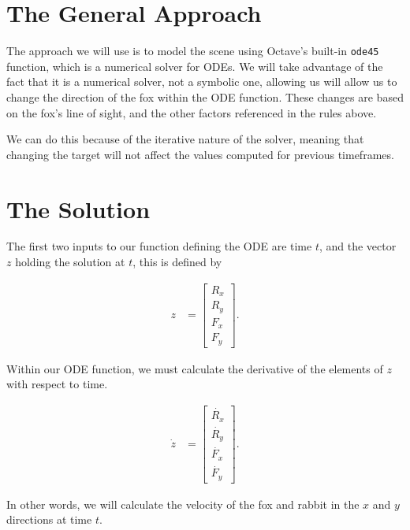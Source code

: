 

\section{The General Approach}

The approach we will use is to model the scene using Octave's built-in \texttt{ode45} function, which is a numerical solver for ODEs. We will take advantage of the fact that it is a numerical solver, not a symbolic one, allowing us will allow us to change the direction of the fox within the ODE function. These changes are based on the fox's line of sight, and the other factors referenced in the rules above. 

We can do this because of the iterative nature of the solver, meaning that changing the target will not affect the values computed for previous timeframes.

\section {The Solution}

The first two inputs to our function defining the ODE are time $t$, and the vector $z$ holding the solution at $t$, this is defined by

\begin{align}
    z &= \begin{bmatrix}
           R_x \\
           R_y \\
           F_x \\
           F_y
         \end{bmatrix}.
  \end{align}

Within our ODE function, we must calculate the derivative of the elements of $z$ with respect to time. 

\begin{align}
    \dot{z} &= \begin{bmatrix}
            \dot{R_x} \\
            \dot{R_y} \\
            \dot{F_x} \\
            \dot{F_y}
         \end{bmatrix}.
  \end{align}
 
In other words, we will calculate the velocity of the fox and rabbit in the $x$ and $y$ directions at time $t$.

